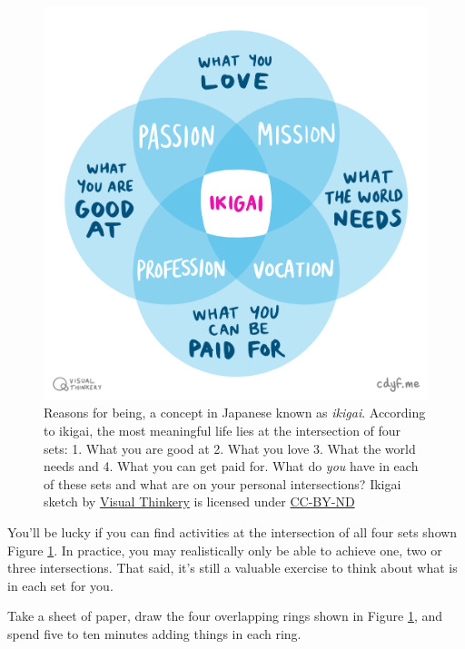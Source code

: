 \documentclass[
]{book}
\begin{document}
\begin{figure}

{\centering \includegraphics[width=1\linewidth]{images/IKIGAI-visual-thinkery} 

}

\caption{Reasons for being, a concept in Japanese known as \emph{ikigai}. According to ikigai, the most meaningful life lies at the intersection of four sets: 1. What you are good at 2. What you love 3. What the world needs and 4. What you can get paid for. What do \emph{you} have in each of these sets and what are on your personal intersections? Ikigai sketch by \href{https://visualthinkery.com}{Visual Thinkery} is licensed under \href{https://creativecommons.org/licenses/by-nd/4.0/}{CC-BY-ND}}\label{fig:iki-fig}
\end{figure}



You'll be lucky if you can find activities at the intersection of all four sets shown Figure \ref{fig:iki-fig}. In practice, you may realistically only be able to achieve one, two or three intersections. That said, it's still a valuable exercise to think about what is in each set for you.

Take a sheet of paper, draw the four overlapping rings shown in Figure \ref{fig:iki-fig}, and spend five to ten minutes adding things in each ring.
\end{document}
